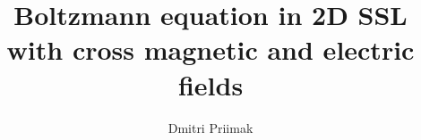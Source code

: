 \documentclass[40pt,letterpaper]{article}
\author{Dmitri Priimak}
\title{Boltzmann equation in 2D SSL with cross magnetic and electric fields}
\begin{document}
\begin{figure}
\normalsize %

\end{figure}
\end{document}
